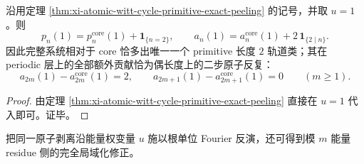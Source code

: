 \begin{corollary}\label{cor:xi-atomic-witt-unweighted-unique-two-step-class}
沿用定理 \ref{thm:xi-atomic-witt-cycle-primitive-exact-peeling} 的记号，并取 \(u=1\)。则
\[
p_n(1)=p_n^{\mathrm{core}}(1)+\mathbf 1_{\{n=2\}},
\qquad
a_n(1)=a_n^{\mathrm{core}}(1)+2\,\mathbf 1_{\{2\mid n\}}.
\]
因此完整系统相对于 core 恰多出唯一一个 primitive 长度 \(2\) 轨道类；其在 periodic 层上的全部额外贡献恰为偶长度上的二步原子反复：
\[
a_{2m}(1)-a_{2m}^{\mathrm{core}}(1)=2,
\qquad
a_{2m+1}(1)-a_{2m+1}^{\mathrm{core}}(1)=0
\qquad (m\ge 1).
\]
\end{corollary}
\begin{proof}
由定理 \ref{thm:xi-atomic-witt-cycle-primitive-exact-peeling} 直接在 \(u=1\) 代入即可。证毕。
\end{proof}

把同一原子剥离沿能量权变量 \(u\) 施以根单位 Fourier 反演，还可得到模 \(m\) 能量 residue 侧的完全局域化修正。

